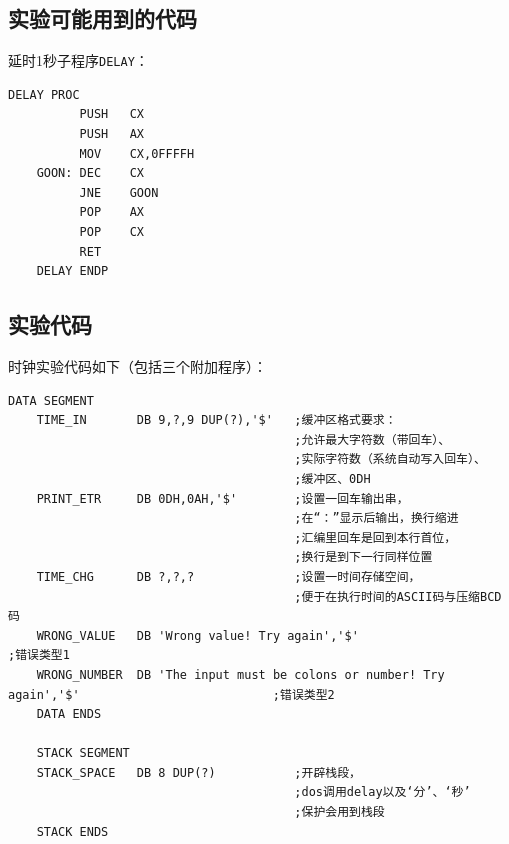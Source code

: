 \documentclass[11pt]{SEU-Digital-Report}
\begin{document}
\subsection{实验可能用到的代码}
延时1秒子程序\texttt{DELAY}：
\begin{lstlisting}[language={[x86masm]Assembler},title=delay]
    DELAY PROC
          PUSH   CX
          PUSH   AX
          MOV    CX,0FFFFH
    GOON: DEC    CX
          JNE    GOON
          POP    AX
          POP    CX
          RET
    DELAY ENDP
\end{lstlisting}

\subsection{实验代码}
时钟实验代码如下（包括三个附加程序）：
\begin{lstlisting}[language={[x86masm]Assembler},title=CLK]
    DATA SEGMENT
    TIME_IN       DB 9,?,9 DUP(?),'$'   ;缓冲区格式要求：
                                        ;允许最大字符数（带回车）、
                                        ;实际字符数（系统自动写入回车）、
                                        ;缓冲区、0DH
    PRINT_ETR     DB 0DH,0AH,'$'        ;设置一回车输出串，
                                        ;在“：”显示后输出，换行缩进
                                        ;汇编里回车是回到本行首位，
                                        ;换行是到下一行同样位置
    TIME_CHG      DB ?,?,?              ;设置一时间存储空间，
                                        ;便于在执行时间的ASCII码与压缩BCD码
    WRONG_VALUE   DB 'Wrong value! Try again','$'                           ;错误类型1
    WRONG_NUMBER  DB 'The input must be colons or number! Try again','$'                           ;错误类型2
    DATA ENDS

    STACK SEGMENT
    STACK_SPACE   DB 8 DUP(?)           ;开辟栈段，
                                        ;dos调用delay以及‘分’、‘秒’
                                        ;保护会用到栈段
    STACK ENDS


\end{lstlisting}
\end{document}
